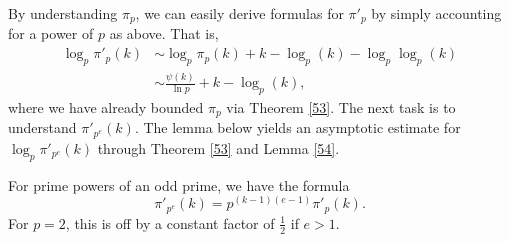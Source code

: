 \documentclass[12pt]{article}
\begin{document}
By understanding $\pi_p$, we can easily derive formulas for $\pi'_p$ by simply accounting for a power of $p$ as above. That is,
\begin{align*}
\log_p \pi'_p(k) &\sim \log_p \pi_p(k) + k - \log_p(k) - \log_p \log_p(k)\\
&\sim \frac{\psi(k)}{\ln p}+k - \log_p(k),
\end{align*}
where we have already bounded $\pi_p$ via Theorem \ref{53}. The next task is to understand $\pi'_{p^e}(k)$. The lemma below yields an asymptotic estimate for $\log_p \pi'_{p^e}(k)$ through Theorem \ref{53} and Lemma \ref{54}.

\begin{lemma}
For prime powers of an odd prime, we have the formula 
\[\pi'_{p^e}(k) = p^{(k-1)(e-1)}\pi'_p(k). \tag{6}\]
For $p=2$, this is off by a constant factor of $\frac{1}{2}$ if $e>1$.
\end{lemma} 
\end{document}

